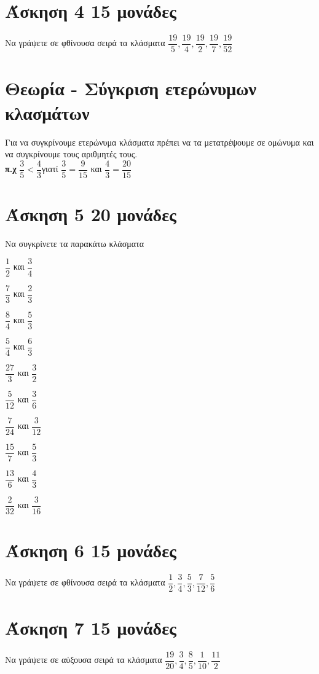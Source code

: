 \documentclass[a4paper,10pt]{report}
\begin{document}
\section*{Άσκηση 4  \hfill \small{15 μονάδες}}
Να γράψετε σε φθίνουσα σειρά τα  κλάσματα
$ \dfrac{19}{5}, \dfrac{19}{4}, \dfrac{19}{2}, \dfrac{19}{7}, \dfrac{19}{52} $


\section*{Θεωρία - Σύγκριση ετερώνυμων κλασμάτων\hfill \small{}}
Για να συγκρίνουμε ετερώνυμα κλάσματα πρέπει να τα μετατρέψουμε σε ομώνυμα και να συγκρίνουμε τους αριθμητές τους.\\
\textbf{π.χ} $\dfrac{3}{5}<\dfrac{4}{3}$\quad γιατί \quad $\dfrac{3}{5}=\dfrac{9}{15}$ και $\dfrac{4}{3}=\dfrac{20}{15}$



\section*{Άσκηση 5  \hfill \small{20 μονάδες}}
Να συγκρίνετε τα παρακάτω κλάσματα 
\begin{enumerate}[1)]
\begin{multicols}{2}
 \item $\dfrac{1}{2}$ και $\dfrac{3}{4}$
 \item $\dfrac{7}{3}$ και $\dfrac{2}{3}$
 \item $\dfrac{8}{4}$ και $\dfrac{5}{3}$
 \item $\dfrac{5}{4}$ και $\dfrac{6}{3}$
 \item $\dfrac{27}{3}$ και $\dfrac{3}{2}$
 \item $\dfrac{5}{12}$ και $\dfrac{3}{6}$
 \item $\dfrac{7}{24}$ και $\dfrac{3}{12}$
 \item $\dfrac{15}{7}$ και $\dfrac{5}{3}$
 \item $\dfrac{13}{6}$ και $\dfrac{4}{3}$
 \item $\dfrac{2}{32}$ και $\dfrac{3}{16}$
\end{multicols}
\end{enumerate}

\section*{Άσκηση 6  \hfill \small{15 μονάδες}}
Να γράψετε σε φθίνουσα σειρά τα  κλάσματα
$ \dfrac{1}{2}, \dfrac{3}{4}, \dfrac{5}{3}, \dfrac{7}{12}, \dfrac{5}{6} $


\section*{Άσκηση 7  \hfill \small{15 μονάδες}}
Να γράψετε σε αύξουσα σειρά τα  κλάσματα
$ \dfrac{19}{20}, \dfrac{3}{4}, \dfrac{8}{5}, \dfrac{1}{10}, \dfrac{11}{2} $
\end{document}
